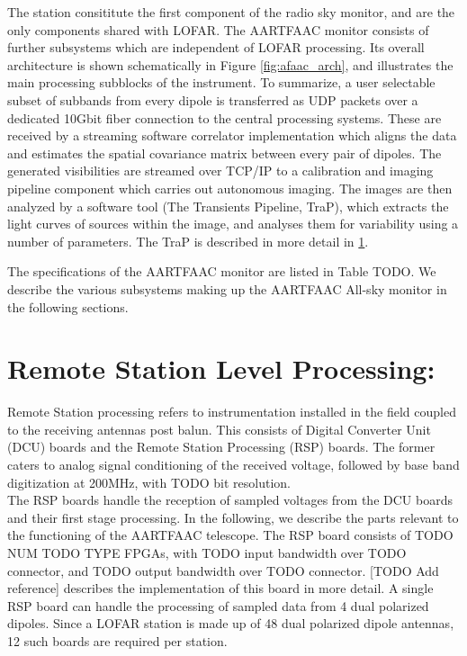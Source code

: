 \documentclass{aa}
\begin{document}
The station  consititute the first component  of the radio sky  monitor, and are
the only components shared with LOFAR.  The AARTFAAC monitor consists of further
subsystems which are independent of  LOFAR processing.  Its overall architecture
is shown schematically in Figure  \ref{fig:afaac_arch}, and illustrates the main
processing subblocks of the instrument.   To summarize, a user selectable subset
of subbands  from every dipole  is transferred as  UDP packets over  a dedicated
10Gbit fiber connection  to the central processing systems.   These are received
by  a streaming  software correlator  implementation which  aligns the  data and
estimates  the spatial  covariance matrix  between every  pair of  dipoles.  The
generated visibilities  are streamed  over TCP/IP to  a calibration  and imaging
pipeline component  which carries out  autonomous imaging.  The images  are then
analyzed by a software tool (The  Transients Pipeline, TraP), which extracts the
light curves  of sources  within the  image, and  analyses them  for variability
using a number of parameters. The TraP is described in more detail in \ref{}.

The  specifications of  the  AARTFAAC  monitor are  listed  in  Table TODO.   We
describe the  various subsystems making up  the AARTFAAC All-sky monitor  in the
following sections.

\section {\label{sec:station_hardware} Remote Station Level Processing:} 
Remote  Station processing  refers  to instrumentation  installed  in the  field
coupled to the receiving antennas post balun. This consists of Digital Converter
Unit (DCU)  boards and the  Remote Station  Processing (RSP) boards.  The former
caters to analog  signal conditioning of the received voltage,  followed by base
band digitization  at 200MHz, with TODO bit resolution.\\

The RSP boards handle the reception of  sampled voltages from the DCU boards and
their first stage  processing. In the following, we describe  the parts relevant
to  the functioning  of  the  AARTFAAC telescope.   The  RSP  board consists  of
TODO NUM TODO TYPE  FPGAs, with  TODO input bandwidth  over TODO  connector, and
TODO output bandwidth  over TODO connector.  [TODO Add  reference] describes the
implementation of this board  in more detail. A single RSP  board can handle the
processing of sampled data from 4 dual polarized dipoles.  Since a LOFAR station
is made up of 48 dual polarized dipole antennas, 12 such boards are required per
station.\\
\end{document}
